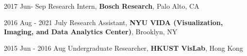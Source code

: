 2017 Jun- Sep \hspace{11mm} 
Research Intern, \textbf{Bosch Research}, Palo Alto, CA

2016 Aug - 2021 July \hspace{1mm} 
Research Assistant, \textbf{NYU VIDA (Visualization, Imaging, and Data Analytics Center)}, Brooklyn, NY

2015 Jun - 2016 Aug \hspace{1.5mm}
Undergraduate Researcher, \textbf{HKUST VisLab}, Hong Kong


